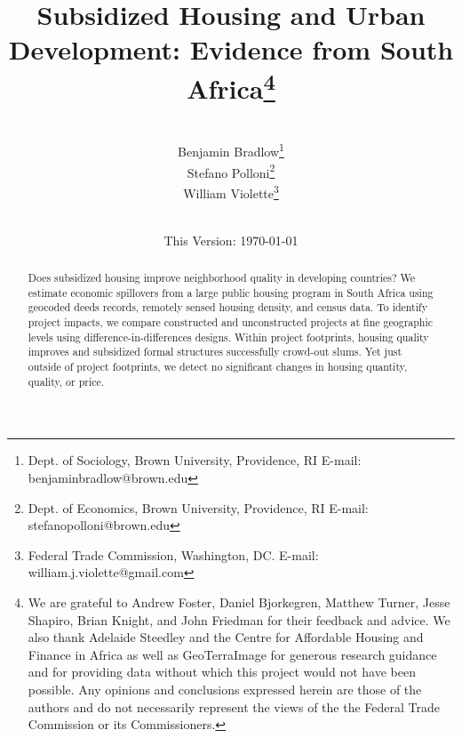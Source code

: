 \documentclass[12pt]{article}
\begin{document}
\begin{titlepage} 
\title{{Subsidized Housing and Urban Development: Evidence from South Africa}\thanks{We are grateful to Andrew Foster, Daniel Bjorkegren, Matthew Turner, Jesse Shapiro, Brian Knight, and John Friedman for their feedback and advice.  We also thank Adelaide Steedley and the Centre for Affordable Housing and Finance in Africa as well as GeoTerraImage for generous research guidance and for providing data without which this project would not have been possible.  Any opinions and conclusions expressed herein are those of the authors and do not necessarily represent the views of the the Federal Trade Commission or its Commissioners.}}
\author{\\[3em] Benjamin Bradlow\thanks{Dept. of Sociology, Brown University, Providence, RI  E-mail: benjamin\textunderscore bradlow@brown.edu}\\
 Stefano Polloni\thanks{Dept. of Economics, Brown University, Providence, RI E-mail: stefano\textunderscore polloni@brown.edu}\\ 
  William Violette\thanks{Federal Trade Commission, Washington, DC. E-mail: william.j.violette@gmail.com} \\
 \\ 
  }
\vspace{30mm}
\date{\vspace{5mm}This Version: \today}
\maketitle
\begin{abstract}

	Does subsidized housing improve neighborhood quality in developing countries? We estimate economic spillovers from a large public housing program in South Africa using geocoded deeds records, remotely sensed housing density, and census data.  To identify project impacts, we compare constructed and unconstructed projects at fine geographic levels using difference-in-differences designs.  Within project footprints, housing quality improves and subsidized formal structures successfully crowd-out slums. Yet just outside of project footprints, we detect no significant changes in housing quantity, quality, or price. 

\bigskip
\end{abstract}
\setcounter{page}{0}
\thispagestyle{empty}
\end{titlepage}
\pagebreak \newpage
\end{document}
